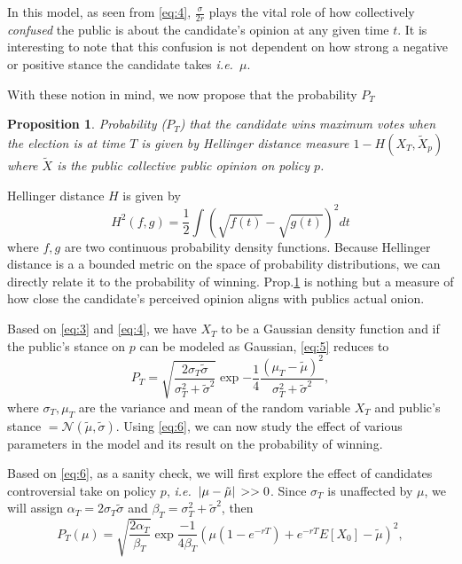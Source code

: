 \documentclass[aps,prl,twocolumn,showpacs,final]{revtex4-2}
\newcommand{\ie}{\textit{i.e.\ }}
\newtheorem{prop}{Proposition}[section]
\newcommand\pN{\mathcal{N}}
\begin{document}
In this model, as seen from \eqref{eq:4}, $\frac{\sigma}{2r}$ plays the vital role of how collectively \textit{confused} the public is about the candidate's opinion at any given time $t$. It is interesting to note that this confusion is not dependent on how strong a negative or positive stance the candidate takes \ie $\mu$. 

With these notion in mind, we now propose that the probability $P_T$

\begin{prop}
\label{prop1}
Probability  ($P_T$) that the candidate wins maximum votes when the election is at time $T$ is given by Hellinger distance measure $1-H(X_T,\tilde{X}_p)$ where  $\tilde{X}$ is the public collective public opinion on policy $p$.
\end{prop}

Hellinger distance $H$ is given by\cite{hellinger1909neue} 
\begin{equation}
H^{2}(f, g)=
\frac{1}{2} \int(\sqrt{f(t)}-\sqrt{g(t)})^{2} d t\label{eq:5}
\end{equation}
where $f,g$ are two continuous probability density functions. Because Hellinger distance is a a bounded metric on the space of probability distributions, we can directly relate it to the probability of winning. Prop.\ref{prop1} is nothing but a measure of how close the candidate's perceived opinion aligns with publics actual onion.

Based on \eqref{eq:3} and \ref{eq:4}, we have $X_T$ to be a Gaussian density function and if the public's stance on $p$ can be modeled as Gaussian, \eqref{eq:5} reduces to 
\begin{equation}
P_T=\sqrt{\frac{2 \sigma_{T} \tilde{\sigma}}{\sigma_{T}^{2}+\tilde{\sigma}^{2}}} \exp{-\frac{1}{4} \frac{\left(\mu_{T}-\tilde{\mu}\right)^{2}}{\sigma_{T}^{2}+\tilde{\sigma}^{2}}}\label{eq:6},
\end{equation}
where $\sigma_T,\mu_T$ are the variance and mean of the random variable $X_T$ and public's stance $=\pN(\tilde{\mu},\tilde{\sigma})$. Using \eqref{eq:6}, we can now study the effect of various parameters in the model and its result on the probability of winning.

Based on \eqref{eq:6}, as a sanity check, we will first explore the effect of candidates controversial take on policy $p$, \ie $\abs*{\mu-\tilde{\mu}}>>0$. Since $\sigma_T$ is unaffected by $\mu$, we will assign $\alpha_T=2 \sigma_{T} \tilde{\sigma}$ and $\beta_T=\sigma_{T}^{2}+\tilde{\sigma}^{2}$, then 
\begin{dmath}
P_T(\mu)=\sqrt{\frac{2\alpha_T}{\beta_T}}\exp{\frac{-1}{4\beta_T}\left(\mu\left(1-e^{-r T}\right)+e^{-r T} E \left[X_{0}\right]-\tilde{\mu}\right)^2}\label{eq:7},
\end{dmath}
\end{document}
